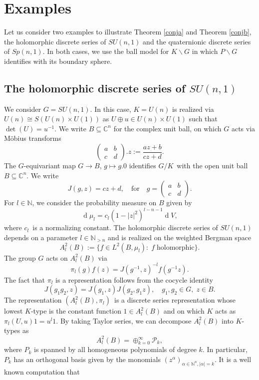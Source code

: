 \documentclass[a4paper,reqno]{amsart}
\numberwithin{equation}{section}
\def\rd{\operatorname{d}\!}
\def\C{\mathbb{C}}
\def\N{\mathbb{N}}
\theoremstyle{definition}
\theoremstyle{remark}
\begin{document}
\section{Examples}

Let us consider two examples to illustrate Theorem \ref{conja} and Theorem \ref{conjb}, the holomorphic discrete series of $SU(n,1)$ and the quaternionic discrete series of $Sp(n,1)$. In both cases, we use the ball model for $K\backslash G$ in which $P\backslash G$ identifies with its boundary sphere. 

\subsection{The holomorphic discrete series of $SU(n,1)$}

We consider $G=SU(n,1)$. In this case, $K=U(n)$ is realized via $U(n)\cong S(U(n)\times U(1))$ as $U\oplus u\in U(n)\times U(1)$ such that $\det(U)=u^{-1}$. We write $B\subseteq \C^n$ for the complex unit ball, on which $G$ acts via Möbius transforms 
$$\begin{pmatrix} a& b\\c&d\end{pmatrix}.z:=\frac{az+b}{cz+d}.$$
The $G$-equivariant map $G\to B$, $g\mapsto g.0$ identifies $G/K$ with the open unit ball $B\subseteq \C^n$. We write 
$$J(g,z)=cz+d, \quad\mbox{for}\quad g=\begin{pmatrix} a& b\\c&d\end{pmatrix}.$$ 
For $l\in \N$, we consider the probability measure on $B$ given by 
$$\rd\mu_l=c_l(1-|z|^2)^{l-n-1} \rd V,$$
where $c_l$ is a normalizing constant. The holomorphic discrete series of $SU(n,1)$ depends on a parameter $l\in \N_{> n}$ and is realized on the weighted Bergman space 
$$A^2_l(B):=\{f\in L^2(B,\mu_l): \; f\; \mbox{holomorphic}\}.$$
The group $G$ acts on $A^2_l(B)$ via 
$$\pi_l(g)f(z)=J(g^{-1},z)^{-l}f(g^{-1}z).$$
The fact that $\pi_l$ is a representation follows from the cocycle identity 
$$J(g_1g_2,z)=J(g_1,z)J(g_2,g_1z),\quad g_1,g_2\in G, \; z\in B.$$
The representation $(A^2_l(B),\pi_l)$ is a discrete series representation whose lowest $K$-type is the constant function $1\in A^2_l(B)$ and on which $K$ acts as $\pi_l(U,u)1=u^l1$. By taking Taylor series, we can decompose $A^2_l(B)$ into $K$-types as
$$A^2_l(B)=\oplus_{k=0}^\infty \mathcal{P}_k,$$
where $P_k$ is spanned by all homogeneous polynomials of degree $k$. In particular, $P_k$ has an orthogonal basis given by the monomials $(z^\alpha)_{\alpha\in \N^n, |\alpha|=k}$. It is a well known computation that
\end{document}
